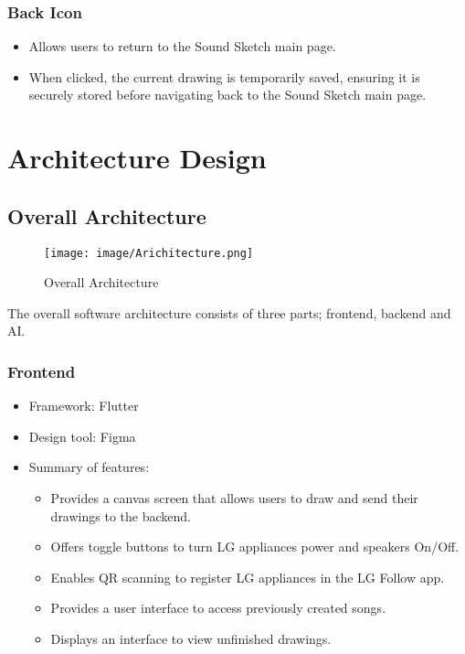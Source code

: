\documentclass[conference]{IEEEtran}
\begin{document}
\subsubsection{Back Icon}
\begin{itemize}
    \item Allows users to return to the Sound Sketch main page.\\
    \item When clicked, the current drawing is temporarily saved, ensuring it is securely stored before navigating back to the Sound Sketch main page.\\
\end{itemize}

\vspace{3cm}

\section{Architecture Design}

\subsection{Overall Architecture}

\begin{figure}[h!]
    \centering
    \texttt{[image: image/Arichitecture.png]}
    \caption{Overall Architecture}
    \label{fig:enter-label}
\end{figure}

 \noindent The overall software architecture consists of three parts; frontend, backend and AI.\\

 \subsubsection{Frontend}
 \begin{itemize}
     \item Framework: Flutter\\
     \item Design tool: Figma\\
     \item Summary of features:
\begin{itemize}
    \item Provides a canvas screen that allows users to draw and send their drawings to the backend.\\
    \item Offers toggle buttons to turn LG appliances power and speakers On/Off.\\
    \item Enables QR scanning to register LG appliances in the LG Follow app.\\
    \item Provides a user interface to access previously created songs.\\
    \item Displays an interface to view unfinished drawings.\\
\end{itemize}
 \end{itemize}
\end{document}
